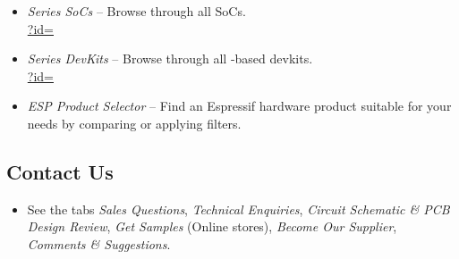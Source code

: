 {\begin{minipage}{\textwidth}
\begin{itemize}
    \item \textit{\chipseries{} Series SoCs} --
        {\small Browse through all \chipseries{} SoCs.}\\
        \href{\linkprefix\linkespsocsEN?id=\chipseries}{\linkprefix\linkespsocsEN?id=\chipseries}
    \item \textit{\chipseries{} Series DevKits} --
        {\small Browse through all \chipseries{}-based devkits.}\\
        \href{\linkprefix\linkespdevkitsEN?id=\chipseries}{\linkprefix\linkespdevkitsEN?id=\chipseries}
    \item \textit{ESP Product Selector} --
        {\small Find an Espressif hardware product suitable for your needs by comparing or applying filters.}\\
        \href{\linkprefix\linkespproductselectorEN}{\linkprefix\linkespproductselectorEN}
\end{itemize}

\end{minipage}



\begin{minipage}{\textwidth}

\subsection*{Contact Us}

\begin{itemize}
    \item See the tabs \textit{Sales Questions}, \textit{Technical Enquiries}, \textit{Circuit Schematic \& PCB Design Review}, \textit{Get Samples} (Online stores), \textit{Become Our Supplier}, \textit{Comments \& Suggestions}.\\
        \href{\linkprefix\linksalesEN}{\linkprefix\linksalesEN}
\end{itemize}

\end{minipage}

}%
